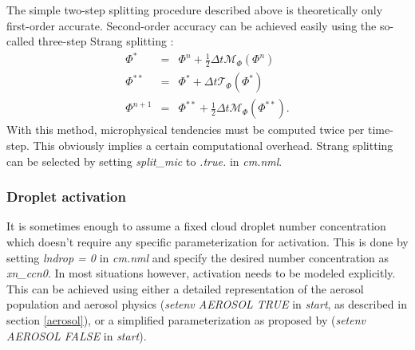 \documentclass[12pt,A4,french]{article}
\begin{document}
\begin{description}
The simple two-step splitting procedure described above is theoretically only first-order accurate. Second-order accuracy can be achieved easily using the so-called three-step Strang splitting \cite{Lev2002}:
\begin{eqnarray}
    \Phi^* &=& \Phi^n + \frac{1}{2}\Delta t \mathcal{M}_\Phi\left(\Phi^n\right) \\
    \Phi^{**} &=& \Phi^* + \Delta t \mathcal{T}_\Phi\left(\Phi^*\right) \\
    \Phi^{n+1} &=& \Phi^{**} + \frac{1}{2}\Delta t \mathcal{M}_\Phi\left(\Phi^{**}\right).
\end{eqnarray}
With this method, microphysical tendencies must be computed twice per time-step. This obviously implies a certain computational overhead. Strang splitting can be selected by setting {\it split\_mic} to {\it .true.} in {\it cm.nml}.

\end{description}

\subsubsection{Droplet activation}
\label{activ_CCN}

It is sometimes enough to assume a fixed cloud droplet number concentration which doesn't require any specific parameterization for activation. This is done by setting {\it lndrop = 0} in {\it cm.nml} and specify the desired number concentration as {\it xn\_ccn0}. In most situations however, activation needs to be modeled explicitly. This can be achieved using either a detailed representation of the aerosol population and aerosol physics ({\it setenv AEROSOL TRUE} in {\it start}, as described in section \ref{aerosol}), or a simplified parameterization as proposed by \cite{KC1999, KC2006} ({\it setenv AEROSOL FALSE} in {\it start}).
\end{document}

